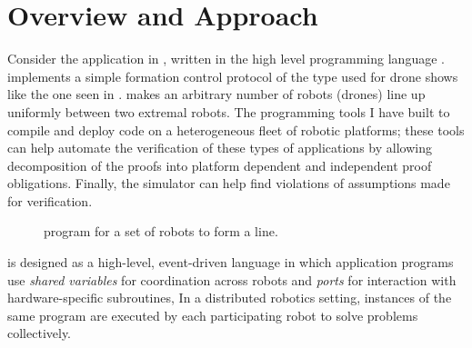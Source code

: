 \section{Overview and Approach}
\label{sec:overview}
\newcommand{\Motion}{\emph{Motion}\xspace}
Consider the application \LineForm in , written in the high level programming language \lgname. \LineForm implements a simple formation control protocol of the type  used for drone shows like the one seen in . \LineForm makes an arbitrary number of robots (drones) line up uniformly between two extremal robots. The programming tools I have built to compile and deploy \lgname code on a heterogeneous fleet of robotic platforms;
these tools can help automate the verification of these types of applications by allowing decomposition of the proofs into platform dependent and independent proof obligations. Finally, the \lgname simulator can help find violations of assumptions made for verification.

\begin{figure}[htbp!]
\centering
\begin{minipage}{0.8\linewidth}
    \begin{mdframed}
    [innertopmargin=0pt,innerbottommargin=0pt]
    {
        
    }
    {
        
    }\end{mdframed}
    \caption{\small\vspace{-4mm}\lgname program \LineForm for a set of robots to form a line.\vspace{-5mm}}
\end{minipage}

    \label{fig:lineform}
    
\end{figure}

\lgname is designed as a high-level, event-driven language in which application programs use \emph{shared variables} for coordination across robots
and \emph{ports} for interaction with hardware-specific subroutines,
In a distributed robotics setting, instances of the same \lgname program are executed by each participating robot to solve problems collectively.

